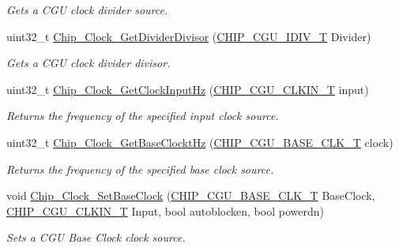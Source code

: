 \begin{DoxyCompactItemize}
\begin{DoxyCompactList}\small\item\em Gets a C\+GU clock divider source. \end{DoxyCompactList}\item 
uint32\+\_\+t \hyperlink{group___c_l_o_c_k__18_x_x__43_x_x_gaeecd015038258f1cc4f746054268d94f}{Chip\+\_\+\+Clock\+\_\+\+Get\+Divider\+Divisor} (\hyperlink{chip__clocks_8h_a588e8716294cc2deec5d583add455521}{C\+H\+I\+P\+\_\+\+C\+G\+U\+\_\+\+I\+D\+I\+V\+\_\+T} Divider)
\begin{DoxyCompactList}\small\item\em Gets a C\+GU clock divider divisor. \end{DoxyCompactList}\item 
uint32\+\_\+t \hyperlink{group___c_l_o_c_k__18_x_x__43_x_x_ga4ad0a2b922ac85f94ab0bb2036def308}{Chip\+\_\+\+Clock\+\_\+\+Get\+Clock\+Input\+Hz} (\hyperlink{group___c_l_o_c_k__18_x_x__43_x_x_ga0975326707efebf2b074283e6c602f18}{C\+H\+I\+P\+\_\+\+C\+G\+U\+\_\+\+C\+L\+K\+I\+N\+\_\+T} input)
\begin{DoxyCompactList}\small\item\em Returns the frequency of the specified input clock source. \end{DoxyCompactList}\item 
uint32\+\_\+t \hyperlink{group___c_l_o_c_k__18_x_x__43_x_x_ga8686b03c1433974a6473f10cc0203915}{Chip\+\_\+\+Clock\+\_\+\+Get\+Base\+Clockt\+Hz} (\hyperlink{chip__clocks_8h_a31e266dd83cc66eb866d8d051ffd1d45}{C\+H\+I\+P\+\_\+\+C\+G\+U\+\_\+\+B\+A\+S\+E\+\_\+\+C\+L\+K\+\_\+T} clock)
\begin{DoxyCompactList}\small\item\em Returns the frequency of the specified base clock source. \end{DoxyCompactList}\item 
void \hyperlink{group___c_l_o_c_k__18_x_x__43_x_x_gaf5e0d6f4dcbfd5ff64b1ddcd37067ca2}{Chip\+\_\+\+Clock\+\_\+\+Set\+Base\+Clock} (\hyperlink{chip__clocks_8h_a31e266dd83cc66eb866d8d051ffd1d45}{C\+H\+I\+P\+\_\+\+C\+G\+U\+\_\+\+B\+A\+S\+E\+\_\+\+C\+L\+K\+\_\+T} Base\+Clock, \hyperlink{group___c_l_o_c_k__18_x_x__43_x_x_ga0975326707efebf2b074283e6c602f18}{C\+H\+I\+P\+\_\+\+C\+G\+U\+\_\+\+C\+L\+K\+I\+N\+\_\+T} Input, bool autoblocken, bool powerdn)
\begin{DoxyCompactList}\small\item\em Sets a C\+GU Base Clock clock source. \end{DoxyCompactList}\item 

\end{DoxyCompactItemize}
